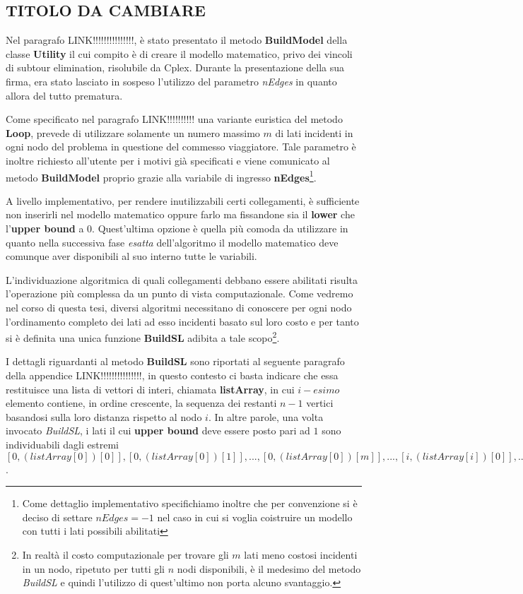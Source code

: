 \documentclass[11pt]{article}
\begin{document}
\subsection*{TITOLO DA CAMBIARE}
\label{sec:TitoloS}

Nel paragrafo LINK!!!!!!!!!!!!!!!, è stato presentato il metodo \textbf{BuildModel} della classe \textbf{Utility} il cui compito è di creare il modello matematico, privo dei vincoli di subtour elimination, risolubile da Cplex. Durante la presentazione della sua firma, era stato lasciato in sospeso l'utilizzo del parametro \textit{nEdges} in quanto allora del tutto prematura.

Come specificato nel paragrafo LINK!!!!!!!!!! una variante euristica del metodo \textbf{Loop}, prevede di utilizzare solamente un numero massimo $m$ di lati incidenti in ogni nodo del problema in questione del commesso viaggiatore. Tale parametro è inoltre richiesto all'utente per i motivi già specificati e viene comunicato al metodo \textbf{BuildModel} proprio grazie alla variabile di ingresso \textbf{nEdges}\footnote{Come dettaglio implementativo specifichiamo inoltre che per convenzione si è deciso di settare $nEdges = -1$ nel caso in cui si voglia coistruire un modello con tutti i lati possibili abilitati}.

A livello implementativo, per rendere inutilizzabili certi collegamenti, è sufficiente non inserirli nel modello matematico oppure farlo ma fissandone sia il \textbf{lower} che l'\textbf{upper bound} a 0. Quest'ultima opzione è quella più comoda da utilizzare in quanto nella successiva fase \textit{esatta} dell'algoritmo il modello matematico deve comunque aver disponibili al suo interno tutte le variabili.

L'individuazione algoritmica di quali collegamenti debbano essere abilitati risulta l'operazione più complessa da un punto di vista computazionale. Come vedremo nel corso di questa tesi, diversi algoritmi necessitano di conoscere per ogni nodo l'ordinamento completo dei lati ad esso incidenti basato sul loro costo e per tanto si è definita una unica funzione \textbf{BuildSL} adibita a tale scopo\footnote{In realtà il costo computazionale per trovare gli $m$ lati meno costosi incidenti in un nodo, ripetuto per tutti gli $n$ nodi disponibili, è il medesimo del metodo \textit{BuildSL} e quindi l'utilizzo di quest'ultimo non porta alcuno svantaggio.}.

I dettagli riguardanti al metodo \textbf{BuildSL} sono riportati al seguente paragrafo della appendice LINK!!!!!!!!!!!!!!!, in questo contesto ci basta indicare che essa restituisce una lista di vettori di interi, chiamata \textbf{listArray}, in cui $i-esimo$ elemento contiene, in ordine crescente, la sequenza dei restanti $n-1$ vertici basandosi sulla loro distanza rispetto al nodo $i$. In altre parole, una volta invocato \textit{BuildSL}, i lati il cui \textbf{upper bound} deve essere posto pari ad $1$ sono individuabili dagli estremi $[0,(listArray[0])[0]], [0,(listArray[0])[1]], ..., [0,(listArray[0])[m]], ..., [i,(listArray[i])[0]], ..., [i,(listArray[i])[m]], ..., [n-1,(listArray[n-1])[0]], ..., [n-1,(listArray[n-1])[m]]$.
\end{document}
